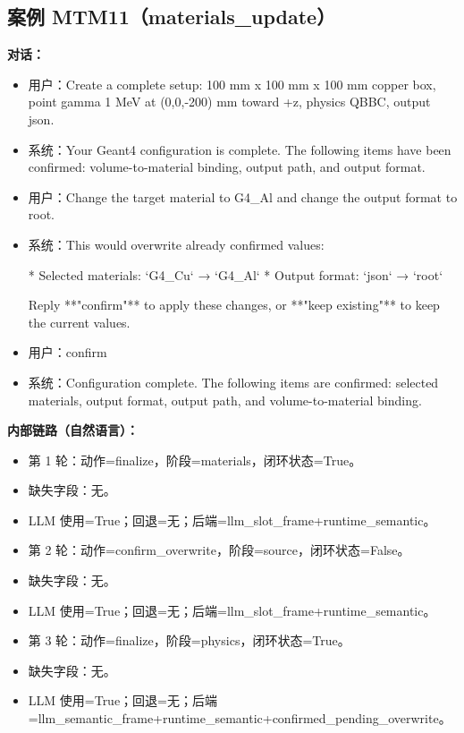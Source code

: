 \documentclass[11pt]{ctexart}
\begin{document}
\subsection{案例 MTM11（materials\_update）}
\textbf{对话：}
\begin{itemize}
\item 用户：Create a complete setup: 100 mm x 100 mm x 100 mm copper box, point gamma 1 MeV at (0,0,-200) mm toward +z, physics QBBC, output json.
\item 系统：Your Geant4 configuration is complete. The following items have been confirmed: volume-to-material binding, output path, and output format.
\item 用户：Change the target material to G4\_Al and change the output format to root.
\item 系统：This would overwrite already confirmed values:

*   Selected materials: `G4\_Cu` → `G4\_Al`
*   Output format: `json` → `root`

Reply **"confirm"** to apply these changes, or **"keep existing"** to keep the current values.
\item 用户：confirm
\item 系统：Configuration complete. The following items are confirmed: selected materials, output format, output path, and volume-to-material binding.
\end{itemize}
\textbf{内部链路（自然语言）：}
\begin{itemize}
\item 第 1 轮：动作=finalize，阶段=materials，闭环状态=True。
\item 缺失字段：无。
\item LLM 使用=True；回退=无；后端=llm\_slot\_frame+runtime\_semantic。
\item 第 2 轮：动作=confirm\_overwrite，阶段=source，闭环状态=False。
\item 缺失字段：无。
\item LLM 使用=True；回退=无；后端=llm\_slot\_frame+runtime\_semantic。
\item 第 3 轮：动作=finalize，阶段=physics，闭环状态=True。
\item 缺失字段：无。
\item LLM 使用=True；回退=无；后端=llm\_semantic\_frame+runtime\_semantic+confirmed\_pending\_overwrite。
\end{itemize}
\end{document}
